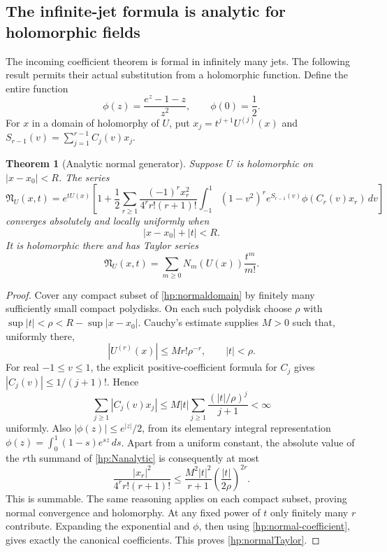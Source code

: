 \documentclass[11pt,a4paper]{article}
\newtheorem{theorem}{Theorem}[section]
\theoremstyle{definition}
\theoremstyle{remark}
\numberwithin{equation}{section}
\begin{document}
\subsection{The infinite-jet formula is analytic for holomorphic fields}

The incoming coefficient theorem is formal in infinitely many jets.
The following result permits their actual substitution from a
holomorphic function. Define the entire function
\[
 \phi(z)=\frac{e^z-1-z}{z^2},\qquad \phi(0)=\frac12.
\]
For $x$ in a domain of holomorphy of $U$, put
$x_j=t^{j+1}U^{(j)}(x)$ and
$S_{r-1}(v)=\sum_{j=1}^{r-1}C_j(v)x_j$.

\begin{theorem}[Analytic normal generator]\label{hp:analyticN}
Suppose $U$ is holomorphic on $|x-x_0|<R$. The series
\begin{equation}\label{hp:Nanalytic}
 \boxed{\displaystyle
 \mathfrak N_U(x,t)=e^{tU(x)}\left[
 1+\frac12\sum_{r\ge1}
 \frac{(-1)^r x_r^2}{4^r r!(r+1)!}
 \int_{-1}^1(1-v^2)^r e^{S_{r-1}(v)}
                         \phi(C_r(v)x_r)\,dv\right]}
\end{equation}
converges absolutely and locally uniformly when
\begin{equation}\label{hp:normaldomain}
                        |x-x_0|+|t|<R.
\end{equation}
It is holomorphic there and has Taylor series
\begin{equation}\label{hp:normalTaylor}
            \mathfrak N_U(x,t)=\sum_{m\ge0}N_m(U(x))\frac{t^m}{m!}.
\end{equation}
\end{theorem}

\begin{proof}
Cover any compact subset of \eqref{hp:normaldomain} by finitely
many sufficiently small compact polydisks. On each such polydisk
choose $\rho$ with $\sup|t|<\rho<R-\sup|x-x_0|$. Cauchy's
estimate supplies $M>0$ such that, uniformly there,
\[
 |U^{(r)}(x)|\le Mr!\rho^{-r},\qquad |t|<\rho.
\]
For real $-1\le v\le1$, the explicit positive-coefficient formula
for $C_j$ gives $|C_j(v)|\le1/(j+1)!$. Hence
\[
 \sum_{j\ge1}|C_j(v)x_j|
 \le M|t|\sum_{j\ge1}\frac{(|t|/\rho)^j}{j+1}<\infty
\]
uniformly. Also $|\phi(z)|\le e^{|z|}/2$, from its elementary
integral representation
$\phi(z)=\int_0^1(1-s)e^{sz}\,ds$.
Apart from a uniform constant, the absolute value of the $r$th
summand of \eqref{hp:Nanalytic} is consequently at most
\[
 \frac{|x_r|^2}{4^r r!(r+1)!}
 \le\frac{M^2|t|^2}{r+1}
                  \left(\frac{|t|}{2\rho}\right)^{2r}.
\]
This is summable. The same reasoning applies on each compact
subset, proving normal convergence and holomorphy. At any fixed
power of $t$ only finitely many $r$ contribute. Expanding the
exponential and $\phi$, then using
\eqref{hp:normal-coefficient}, gives exactly the canonical
coefficients. This proves \eqref{hp:normalTaylor}.
\end{proof}
\end{document}
